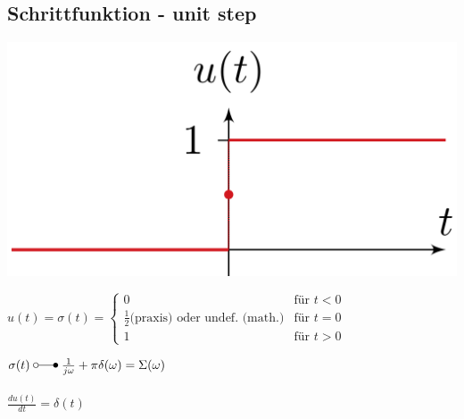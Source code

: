 	\subsection{Schrittfunktion - unit step}
		\begin{minipage}{0.2\textwidth}
			\includegraphics[width=\textwidth]{./bilder/funktionen/sprungF.png}
		\end{minipage}
		\qquad
		\begin{minipage}{0.45\textwidth}
			$u(t) = \sigma(t) =	\begin{cases}
			0 & \text{f\"ur } t < 0 \\
			\frac{1}{2} \text{(praxis)}  \text{ oder undef. (math.)} & \text{f\"ur } t = 0 \\
			1 & \text{f\"ur } t > 0
			\end{cases}$
		\end{minipage}
		\qquad
		\begin{minipage}{0.25\textwidth}						
			$\sigma(t) \; \laplace \; \frac{1}{j\omega} + \pi\delta(\omega) = \Sigma(\omega)$ \\
			\\
			$\frac{du(t)}{dt}=\delta(t)$\\
		\end{minipage}
	
	
